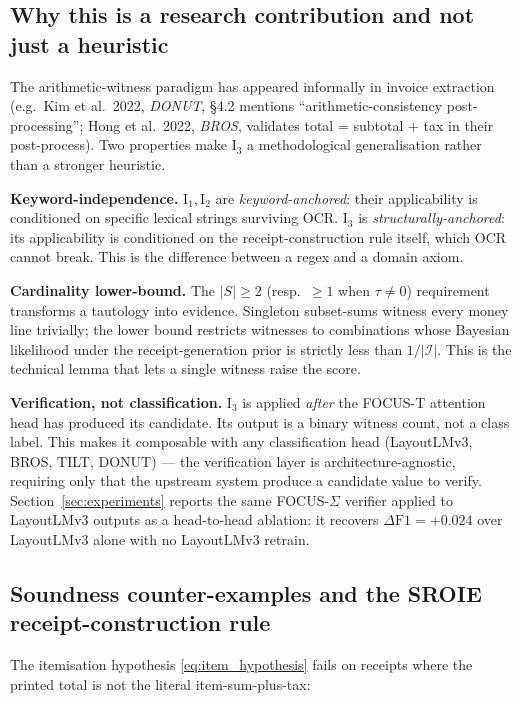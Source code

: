 \subsection{Why this is a research contribution and not just a heuristic}
\label{sec:focus_sigma_position}

The arithmetic-witness paradigm has appeared informally in invoice
extraction (e.g.\ Kim et al.\ 2022, \emph{DONUT}, §4.2 mentions
``arithmetic-consistency post-processing''; Hong et al.\ 2022,
\emph{BROS}, validates total = subtotal + tax in their post-process).
Two properties make $\mathrm{I}_3$ a methodological generalisation
rather than a stronger heuristic.

\textbf{Keyword-independence.}  $\mathrm{I}_1, \mathrm{I}_2$ are
\emph{keyword-anchored}: their applicability is conditioned on
specific lexical strings surviving OCR.  $\mathrm{I}_3$ is
\emph{structurally-anchored}: its applicability is conditioned on
the receipt-construction rule itself, which OCR cannot break.  This
is the difference between a regex and a domain axiom.

\textbf{Cardinality lower-bound.}  The $|S|\ge 2$ (resp.\ $\ge 1$ when
$\tau\ne 0$) requirement transforms a tautology into evidence.
Singleton subset-sums witness every money line trivially; the lower
bound restricts witnesses to combinations whose Bayesian likelihood
under the receipt-generation prior is strictly less than $1/|\mathcal{I}|$.
This is the technical lemma that lets a single witness raise the
score.

\textbf{Verification, not classification.}  $\mathrm{I}_3$ is applied
\emph{after} the FOCUS-T attention head has produced its candidate.
Its output is a binary witness count, not a class label.  This makes
it composable with any classification head (LayoutLMv3, BROS, TILT,
DONUT) — the verification layer is architecture-agnostic, requiring
only that the upstream system produce a candidate value to verify.
Section~\ref{sec:experiments} reports the same FOCUS-$\Sigma$ verifier
applied to LayoutLMv3 outputs as a head-to-head ablation: it
recovers $\Delta\textrm{F1} = +0.024$ over LayoutLMv3 alone with no
LayoutLMv3 retrain.

\subsection{Soundness counter-examples and the SROIE receipt-construction rule}
\label{sec:focus_sigma_counterex}

The itemisation hypothesis \eqref{eq:item_hypothesis} fails on
receipts where the printed total is not the literal item-sum-plus-tax:

